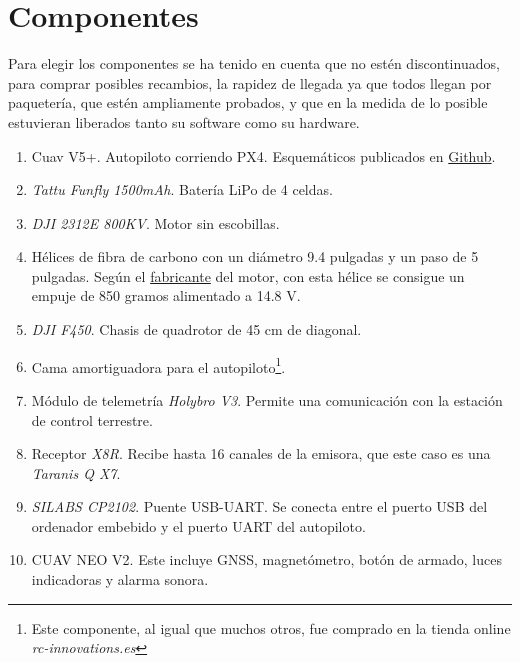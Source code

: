 \section{Componentes}
Para elegir los componentes se ha tenido en cuenta que no estén discontinuados, para comprar posibles recambios, la rapidez de llegada ya que todos llegan por paquetería, que estén ampliamente probados, y que en la medida de lo posible estuvieran liberados tanto su software como su hardware. 
\figComp

\begin{enumerate}
\item Cuav V5+. Autopiloto corriendo PX4. Esquemáticos publicados en \href{https://github.com/ArduPilot/Schematics/tree/master/CUAV/V5_Autopilot/V5\%2B}{Github}.
\item \textit{Tattu Funfly 1500mAh}. Batería LiPo de 4 celdas.
\item \textit{DJI 2312E 800KV}. Motor sin escobillas.
\item Hélices de fibra de carbono con un diámetro 9.4 pulgadas y un paso de 5 pulgadas. Según el \href{https://www.dji.com/e305/spec}{fabricante} del motor, con esta hélice se consigue un empuje de 850 gramos alimentado a 14.8 V.
\item \textit{DJI F450}. Chasis de quadrotor de 45 cm de diagonal. 
\item Cama amortiguadora para el autopiloto\footnote{Este componente, al igual que muchos otros, fue comprado en la tienda online \textit{rc-innovations.es}}.
\item Módulo de telemetría \textit{Holybro V3}. Permite una comunicación con la estación de control terrestre.
\item Receptor \textit{X8R}. Recibe hasta 16 canales de la emisora, que este caso es una \textit{Taranis Q X7}. 
\item \textit{SILABS CP2102}. Puente USB-UART. Se conecta entre el puerto USB del ordenador embebido y el puerto UART del autopiloto.
\item CUAV NEO V2. Este incluye GNSS, magnetómetro, botón de armado, luces indicadoras y alarma sonora.


\end{enumerate}
